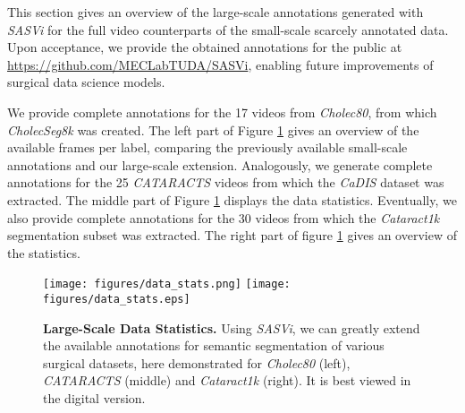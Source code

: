 This section gives an overview of the large-scale annotations generated with \emph{SASVi} for the full video counterparts of the small-scale scarcely annotated data. Upon acceptance, we provide the obtained annotations for the public at \hyperlink{https://github.com/MECLabTUDA/SASVi}{https://github.com/MECLabTUDA/SASVi}, enabling future improvements of surgical data science models.

We provide complete annotations for the 17 videos from \emph{Cholec80}, from which \emph{CholecSeg8k} was created. The left part of Figure \ref{fig:app_data} gives an overview of the available frames per label, comparing the previously available small-scale annotations and our large-scale extension. Analogously, we generate complete annotations for the 25 \emph{CATARACTS} videos from which the \emph{CaDIS} dataset was extracted. The middle part of Figure \ref{fig:app_data} displays the data statistics. Eventually, we also provide complete annotations for the 30 videos from which the \emph{Cataract1k} segmentation subset was extracted. The right part of figure \ref{fig:app_data} gives an overview of the statistics.

\begin{figure}[htbp]
    \centering
    \if{}
        \texttt{[image: figures/data\_stats.png]}
    \else
        \texttt{[image: figures/data\_stats.eps]}
    \fi
    \caption{\textbf{Large-Scale Data Statistics.} Using \emph{SASVi}, we can greatly extend the available annotations for semantic segmentation of various surgical datasets, here demonstrated for \emph{Cholec80} (left), \emph{CATARACTS} (middle) and \emph{Cataract1k} (right). It is best viewed in the digital version.}
    \label{fig:app_data}
\end{figure}

